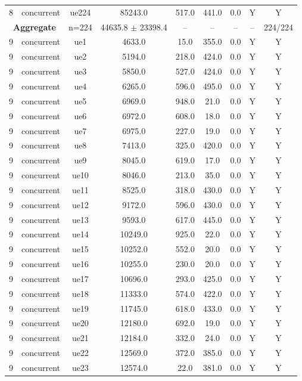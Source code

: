 \begin{table}[ht]
\begin{tabular}{|c|c|c|c|c|c|c|c|c|}
8 & concurrent & ue224 & 85243.0 & 517.0 & 441.0 & 0.0 & Y & Y \\
\multicolumn{2}{|c|}{\textbf{Aggregate}} & n=224 & 44635.8 $\pm$ 23398.4 & -- & -- & -- & -- & 224/224 \\
\hline
9 & concurrent & ue1 & 4633.0 & 15.0 & 355.0 & 0.0 & Y & Y \\
9 & concurrent & ue2 & 5194.0 & 218.0 & 424.0 & 0.0 & Y & Y \\
9 & concurrent & ue3 & 5850.0 & 527.0 & 424.0 & 0.0 & Y & Y \\
9 & concurrent & ue4 & 6265.0 & 596.0 & 495.0 & 0.0 & Y & Y \\
9 & concurrent & ue5 & 6969.0 & 948.0 & 21.0 & 0.0 & Y & Y \\
9 & concurrent & ue6 & 6972.0 & 608.0 & 18.0 & 0.0 & Y & Y \\
9 & concurrent & ue7 & 6975.0 & 227.0 & 19.0 & 0.0 & Y & Y \\
9 & concurrent & ue8 & 7413.0 & 325.0 & 420.0 & 0.0 & Y & Y \\
9 & concurrent & ue9 & 8045.0 & 619.0 & 17.0 & 0.0 & Y & Y \\
9 & concurrent & ue10 & 8046.0 & 213.0 & 35.0 & 0.0 & Y & Y \\
9 & concurrent & ue11 & 8525.0 & 318.0 & 430.0 & 0.0 & Y & Y \\
9 & concurrent & ue12 & 9172.0 & 596.0 & 430.0 & 0.0 & Y & Y \\
9 & concurrent & ue13 & 9593.0 & 617.0 & 445.0 & 0.0 & Y & Y \\
9 & concurrent & ue14 & 10249.0 & 925.0 & 22.0 & 0.0 & Y & Y \\
9 & concurrent & ue15 & 10252.0 & 552.0 & 20.0 & 0.0 & Y & Y \\
9 & concurrent & ue16 & 10255.0 & 230.0 & 20.0 & 0.0 & Y & Y \\
9 & concurrent & ue17 & 10696.0 & 293.0 & 425.0 & 0.0 & Y & Y \\
9 & concurrent & ue18 & 11333.0 & 574.0 & 422.0 & 0.0 & Y & Y \\
9 & concurrent & ue19 & 11745.0 & 618.0 & 433.0 & 0.0 & Y & Y \\
9 & concurrent & ue20 & 12180.0 & 692.0 & 19.0 & 0.0 & Y & Y \\
9 & concurrent & ue21 & 12184.0 & 332.0 & 24.0 & 0.0 & Y & Y \\
9 & concurrent & ue22 & 12569.0 & 372.0 & 385.0 & 0.0 & Y & Y \\
9 & concurrent & ue23 & 12574.0 & 22.0 & 381.0 & 0.0 & Y & Y \\

\end{tabular}
\end{table}
